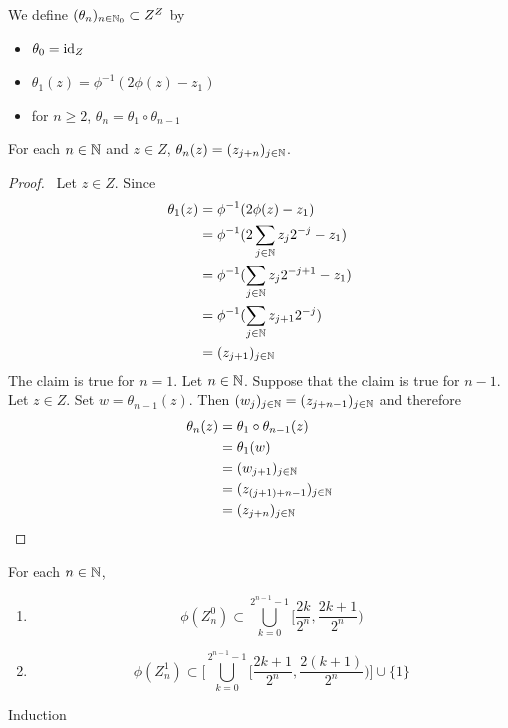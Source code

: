 \documentclass{book}
\begin{document}
	\begin{defn}  
		We define $(\theta_n)_{n \in \mathbb{N}_0} \subset Z^Z$ by
		\begin{itemize}
			\item 	$\theta_0 = \operatorname{id}_Z$
			\item $\theta_1 (z) = \phi^{-1}(2 \phi(z) - z_1)$ 
			\item for $n \geq 2$, $\theta_n = \theta_1 \circ \theta_{n-1}$
		\end{itemize}
	\end{defn}
	
	\begin{ex}  
		For each $n \in \mathbb{N}$ and $z \in Z$, $\theta_n(z) = (z_{j+n})_{j \in \mathbb{N}}$.
	\end{ex}
	
	\begin{proof} \
		Let $z \in Z$. Since  
		\begin{align*}
			\theta_1(z) 
			& = \phi^{-1}(2 \phi(z) - z_1) \\
			& = \phi^{-1}(2 \sum\limits_{j \in \mathbb{N}} z_j2^{-j} - z_1) \\
			& = \phi^{-1}(\sum\limits_{j \in \mathbb{N}} z_j2^{-j+1} - z_1) \\
			& = \phi^{-1}(\sum\limits_{j \in \mathbb{N}} z_{j+1}2^{-j}) \\
			& = (z_{j+1})_{j \in \mathbb{N}}
		\end{align*}
		The claim is true for $n =1$. Let $n \in \mathbb{N}$. Suppose that the claim is true for $n-1$. Let $z \in Z$. Set $w = \theta_{n-1}(z)$. Then $(w_{j})_{j \in \mathbb{N}} = (z_{j+n -1})_{j \in \mathbb{N}}$ and therefore
		\begin{align*}
			\theta_n(z) 
			& = \theta_1 \circ \theta_{n-1} (z) \\
			& = \theta_1 (w) \\
			& = (w_{j + 1})_{j \in \mathbb{N}} \\
			& = (z_{(j+ 1) +  n-1} )_{j \in \mathbb{N}} \\
			& = (z_{j+  n })_{j \in \mathbb{N}}
		\end{align*}
	\end{proof}
	
	
	\begin{ex}  
		For each $n \in \mathbb{N}$, 
		\begin{enumerate}
			\item $$\phi(Z_n^0) \subset \bigcup\limits_{k =0}^{2^{n-1} -1} \bigg[ \frac{2k}{2^n}, \frac{2k+1}{2^n} \bigg)$$
			\item $$\phi(Z_n^1) \subset \bigg[ \bigcup\limits_{k =0}^{2^{n-1} -1} \bigg[ \frac{2k + 1}{2^n}, \frac{2(k+1)}{2^n} \bigg) \bigg] \cup \{1\}$$
		\end{enumerate}
		 Induction
	\end{ex}
	
\end{document}
